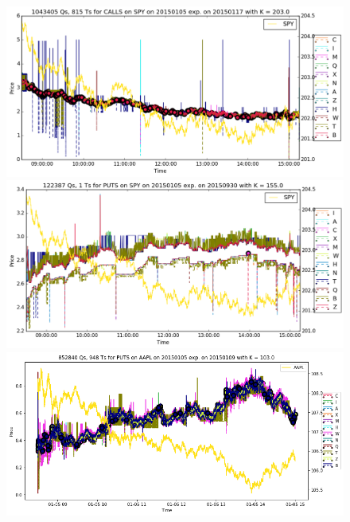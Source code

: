 \documentclass[a4paper,12pt]{article}
\theoremstyle{plain}
\theoremstyle{definition}
\begin{document}
\vspace*{\fill}
\begin{figure}[H]
\begin{center}
 \includegraphics[width=\linewidth]{figures/contract_pics/SPY_top.png}
 \endminipage
 \hspace{3mm}
 \includegraphics[width=\linewidth]{figures/contract_pics/SPY_middle.png}
 \endminipage\\
 \vspace{5mm}
 \includegraphics[width=\linewidth]{figures/contract_pics/AAPL_top.png}
 \endminipage
 \hspace{3mm}

\end{center}
\end{figure}
\end{document}
